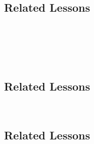 \subsection{Related Lessons}
\fourdNine{}\\
\fourdEleven{}\\
\fourFKTwentySeven{}\\
\fourFKTwentyEight{}\\
%
\subsection{Related Lessons}
\fourdTwelve{}\\
%
\subsection{Related Lessons}
\fourdThirteen{}\\
